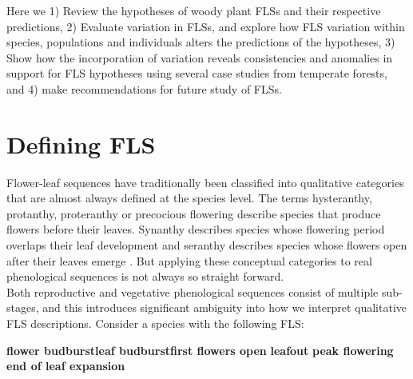 \documentclass[12pt]{article}
\begin{document}
\indent Here we 1) Review the hypotheses of woody plant FLSs and their respective predictions, 2) Evaluate variation in FLSs, and explore how FLS variation within species, populations and individuals alters the predictions of the hypotheses, 3) Show how the incorporation of variation reveals consistencies and anomalies in support for FLS hypotheses using several case studies from temperate forests, and 4) make recommendations for future study of FLSs. 

\section*{Defining FLS}

\indent\indent Flower-leaf sequences have traditionally been classified into qualitative categories that are almost always defined at the species level. The terms hysteranthy, protanthy, proteranthy or precocious flowering describe species that produce flowers before their leaves. Synanthy describes species whose flowering period overlaps their leaf development and seranthy describes species whose flowers open after their leaves emerge \citep{Lamont2011, Heinig1899}. But applying these conceptual categories to real phenological sequences is not always so straight forward.\\

\indent Both reproductive and vegetative phenological sequences consist of multiple sub-stages, and this introduces significant ambiguity into how we interpret qualitative FLS descriptions. Consider a species with the following FLS:\\
\begin{center}
\textbf{flower budburst}\rightarrow \textbf{leaf budburst}\rightarrow \textbf{first flowers open} \rightarrow \textbf{leafout} \rightarrow \textbf{peak flowering} \rightarrow \textbf{end of leaf expansion}\\
\end{center}
\end{document}
